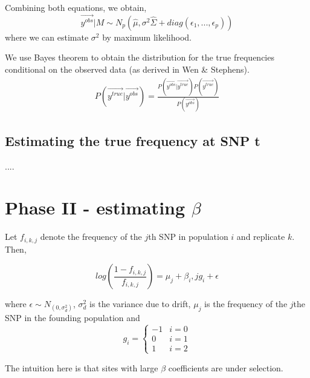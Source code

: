 \documentclass[10pt,a4paper,draft]{article}
\begin{document}
Combining both equations, we obtain,
\begin{equation}
 \vec{y^{obs}}|M \sim N_p(\hat{\mu}, \sigma^2\hat{\Sigma} + diag(\epsilon_1,...,\epsilon_p))
\end{equation}
where we can estimate $\sigma^2$ by maximum likelihood.

We use Bayes theorem to obtain the distribution for the true frequencies conditional on the observed data (as derived in Wen \& Stephens).
\begin{align*}
P(\vec{y^{true}} | \vec{y^{obs}}) = \frac{P(\vec{y^{obs}} | \vec{y^{true}}) P(\vec{y^{true}})}{P(\vec{y^{obs}})} 
\end{align*}

\iffalse
\begin{equation}
\sim N_p\Big((\frac{\hat{\Sigma}^{-1}}{\sigma^2} + \frac{I}{\epsilon^2})^{-1}(\frac{\hat{\Sigma}^{-1}\hat{\mu}}{\sigma^2} + \frac{\vec{y^{obs}}}{\epsilon^2}), (\frac{\hat{\Sigma}^{-1}}{\sigma^2} + \frac{I}{\epsilon^2})^{-1}\Big)\label{likl}
\end{equation}
\fi
\subsection{Estimating the true frequency at SNP t}
....

\section{Phase II - estimating $\beta$}
Let $f_{i,k,j}$ denote the frequency of the $j$th SNP in population $i$ and replicate $k$. Then,

\begin{equation}
log(\frac{1-f_{i,k,j}}{f_{i,k,j}}) = \mu_j + \beta_i,j g_i + \epsilon
\end{equation}

where $\epsilon \sim N_(0, \sigma_d^2)$, $\sigma_d^2$ is the variance due to drift, $\mu_j$ is the frequency of the $j$the SNP in the founding population and 
\[
   g_{i} = \left\{
     \begin{array}{lr}
       -1 &  i =0\\
        0 &  i =1 \\
        1 &  i =2
     \end{array}
   \right.
\]

The intuition here is that sites with large $\beta$ coefficients are under selection.
\end{document}

